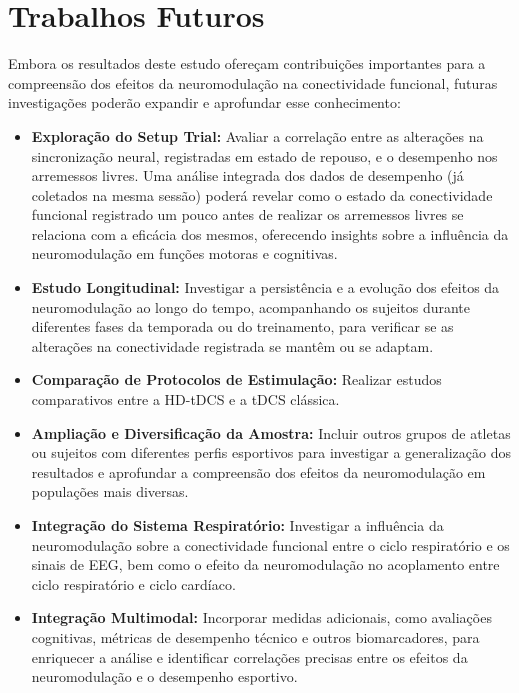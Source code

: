 \section{Trabalhos Futuros}
Embora os resultados deste estudo ofereçam contribuições importantes para a compreensão dos efeitos da neuromodulação na conectividade funcional, futuras investigações poderão expandir e aprofundar esse conhecimento:
\begin{itemize}
    \item \textbf{Exploração do Setup Trial:} Avaliar a correlação entre as alterações na sincronização neural, registradas em estado de repouso, e o desempenho nos arremessos livres. Uma análise integrada dos dados de desempenho (já coletados na mesma sessão) poderá revelar como o estado da conectividade funcional registrado um pouco antes de realizar os arremessos livres se relaciona com a eficácia dos mesmos, oferecendo insights sobre a influência da neuromodulação em funções motoras e cognitivas.
    
    \item \textbf{Estudo Longitudinal:} Investigar a persistência e a evolução dos efeitos da neuromodulação ao longo do tempo, acompanhando os sujeitos durante diferentes fases da temporada ou do treinamento, para verificar se as alterações na conectividade registrada se mantêm ou se adaptam.
    
    \item \textbf{Comparação de Protocolos de Estimulação:} Realizar estudos comparativos entre a HD-tDCS e a tDCS clássica.
    
    \item \textbf{Ampliação e Diversificação da Amostra:} Incluir outros grupos de atletas ou sujeitos com diferentes perfis esportivos para investigar a generalização dos resultados e aprofundar a compreensão dos efeitos da neuromodulação em populações mais diversas.

    \item \textbf{Integração do Sistema Respiratório:} Investigar a influência da neuromodulação sobre a conectividade funcional entre o ciclo respiratório e os sinais de EEG, bem como o efeito da neuromodulação no acoplamento entre ciclo respiratório e ciclo cardíaco.

    \item \textbf{Integração Multimodal:} Incorporar medidas adicionais, como avaliações cognitivas, métricas de desempenho técnico e outros biomarcadores, para enriquecer a análise e identificar correlações precisas entre os efeitos da neuromodulação e o desempenho esportivo.
\end{itemize}
